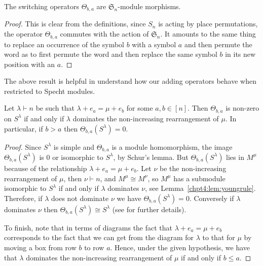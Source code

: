 \documentclass[11pt]{report}
\begin{document}
\begin{lemma}\label{thetamorphism}
	The switching operators $\Theta_{b,a}$ are $\mathfrak{S}_{n}$-module morphisms. 
\end{lemma}	

\begin{proof}
	This is clear from the definitions, since $S_n$ is acting by place 
	permutations, the operator $\Theta_{b,a}$ commutes with the action of
	$\mathfrak{S}_{n}$. It amounts to the same thing to replace an 
	occurrence of the symbol $b$ with a symbol $a$ and then permute the 
	word as to first permute the word and then replace the same symbol $b$ 
	in its new position with an $a$. 
\end{proof}

The above result is helpful in understand how our adding operators behave when restricted to Specht modules. 

\begin{lemma}
	\label{chpt5:lem:restrict}
	Let $\lambda \vdash n$ be such that $\lambda + e_a=\mu+e_b$  for 
	some $a,b\in[n]$. 	Then $\Theta_{b,a}$ is non-zero on $S^{\lambda}$ if and only if 
	$\lambda$ 
	dominates the non-increasing rearrangement of $\mu$. 
	In particular, if $b>a$ then $\Theta_{b,a}(S^{\lambda}) =0$.
\end{lemma}	

\begin{proof}
	Since $S^\lambda$ is simple and $\Theta_{b,a}$ is a module 
	homomorphism, 
	the image  $\Theta_{b,a}(S^\lambda)$ is $0$ or isomorphic to 
	$S^\lambda$, by Schur's lemma.
	But $\Theta_{b,a}(S^\lambda)$ lies in $M^\mu$ because of the 
	relationship $\lambda+e_a = \mu+e_b$. Let $\nu$ be the non-increasing 
	rearrangement of $\mu$, then $\nu\vdash n$, and  $M^\mu \cong 
	M^{\nu}$, so $M^{\mu}$ has a submodule 
	isomorphic to $S^\lambda$ if and only if $\lambda$ dominates $\nu$, 
	see Lemma~\ref{chpt4:lem:youngrule}. Therefore, if $\lambda$ does not dominate $\nu$ we have $\Theta_{b,a}(S^{\lambda}) =0$. Conversely if $\lambda$ dominates $\nu$ then $\Theta_{b,a}(S^{\lambda}) \cong S^{\lambda}$ (see \cite[Section 2.10]{sagan2013symmetric} for further details).
	
	To finish, note that in terms of diagrams the fact that $\lambda+e_a = 
	\mu+e_b$ corresponds to the fact that we can get from the diagram 
	for $\lambda$ to that for $\mu$ by moving a box from row $b$ to row $a$.
	Hence, under the given hypothesis, we have that $\lambda$ dominates the non-increasing rearrangement of 
	$\mu$ if and only if $b\leq a$.
	
	
	
	
	
	
	
	
	
\end{proof}
\end{document}

